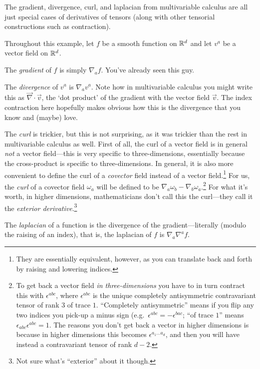 \begin{exm}
The gradient, divergence, curl, and laplacian from multivariable calculus are all just special cases of derivatives of tensors (along with other tensorial constructions such as contraction).

Throughout this example, let $f$ be a smooth function on $\mathbb{R} ^d$ and let $v^a$ be a vector field on $\mathbb{R} ^d$. 

The \emph{gradient} of $f$ is simply $\nabla _af$.  You've already seen this guy.

The \emph{divergence} of $v^a$ is $\nabla _av^a$.  Note how in multivariable calculus you might write this as $\vec{\nabla}\cdot \vec{v}$, the `dot product' of the gradient with the vector field $\vec{v}$.  The index contraction here hopefully makes obvious how this is the divergence that you know and (maybe) love.

The \emph{curl} is trickier, but this is not surprising, as it was trickier than the rest in multivariable calculus as well.  First of all, the curl of a vector field is in general \emph{not} a vector field---this is very specific to three-dimensions, essentially because the cross-product is specific to three-dimensions.  In general, it is also more convenient to define the curl of a \emph{covector} field instead of a vector field.\footnote{They are essentially equivalent, however, as you can translate back and forth by raising and lowering indices.}  For us, the \emph{curl} of a covector field $\omega _a$ will be defined to be $\nabla _a\omega _b-\nabla _b\omega _a$.\footnote{To get back a vector field \emph{in three-dimensions} you have to in turn contract this with $\epsilon ^{abc}$, where $\epsilon ^{abc}$ is the unique completely antisymmetric contravariant tensor of rank $3$ of trace $1$.  ``Completely antisymmetric'' means if you flip any two indices you pick-up a minus sign (e.g.~$\epsilon ^{abc}=-\epsilon ^{bac}$; ``of trace $1$'' means $\epsilon _{abc}\epsilon ^{abc}=1$.  The reasons you don't get back a vector in higher dimensions is because in higher dimensions this becomes $\epsilon ^{a_1\ldots a_d}$, and then you will have instead a contravariant tensor of rank $d-2$.}  For what it's worth, in higher dimensions, mathematicians don't call this the curl---they call it the \emph{exterior derivative}.\footnote{Not sure what's ``exterior'' about it though.}

The \emph{laplacian} of a function is the divergence of the gradient---literally (modulo the raising of an index), that is, the laplacian of $f$ is $\nabla _a\nabla ^af$.
\end{exm}

